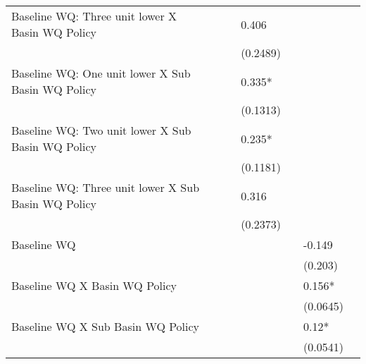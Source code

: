 \begin{table}[ht]
\begin{tabular}{lllllll}
  Baseline WQ: Three unit lower X Basin WQ Policy &  &  & 0.406 &  &  &  \\ 
   &  &  & (0.2489) &  &  &  \\ 
  Baseline WQ: One unit lower X Sub Basin WQ Policy &  &  & 0.335* &  &  &  \\ 
   &  &  & (0.1313) &  &  &  \\ 
  Baseline WQ: Two unit lower X Sub Basin WQ Policy &  &  & 0.235* &  &  &  \\ 
   &  &  & (0.1181) &  &  &  \\ 
  Baseline WQ: Three unit lower X Sub Basin WQ Policy &  &  & 0.316 &  &  &  \\ 
   &  &  & (0.2373) &  &  &  \\ 
  Baseline WQ &  &  &  &  & -0.149 &  \\ 
   &  &  &  &  & (0.203) &  \\ 
  Baseline WQ X Basin WQ Policy &  &  &  &  & 0.156* &  \\ 
   &  &  &  &  & (0.0645) &  \\ 
  Baseline WQ X Sub Basin WQ Policy &  &  &  &  & 0.12* &  \\ 
   &  &  &  &  & (0.0541) &  \\ 
   \hline
\end{tabular}
\end{table}
